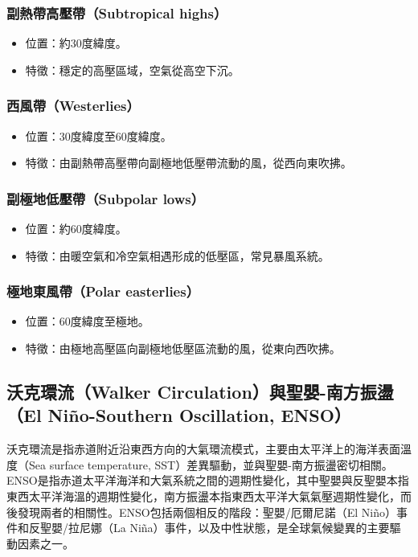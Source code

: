 \documentclass[a4paper,12pt]{report}
\begin{document}
\begin{itemize}
\subsubsection{副熱帶高壓帶（Subtropical highs）}
\begin{itemize}
  \item 位置：約30度緯度。
  \item 特徵：穩定的高壓區域，空氣從高空下沉。
\end{itemize}
\subsubsection{西風帶（Westerlies）}
\begin{itemize}
  \item 位置：30度緯度至60度緯度。
  \item 特徵：由副熱帶高壓帶向副極地低壓帶流動的風，從西向東吹拂。
\end{itemize}
\subsubsection{副極地低壓帶（Subpolar lows）}
\begin{itemize}
  \item 位置：約60度緯度。
  \item 特徵：由暖空氣和冷空氣相遇形成的低壓區，常見暴風系統。
\end{itemize}
\subsubsection{極地東風帶（Polar easterlies）}
\begin{itemize}
  \item 位置：60度緯度至極地。
  \item 特徵：由極地高壓區向副極地低壓區流動的風，從東向西吹拂。
\end{itemize}
\subsection{沃克環流（Walker Circulation）與聖嬰-南方振盪（El Niño-Southern Oscillation, ENSO）}
沃克環流是指赤道附近沿東西方向的大氣環流模式，主要由太平洋上的海洋表面溫度（Sea surface temperature, SST）差異驅動，並與聖嬰-南方振盪密切相關。ENSO是指赤道太平洋海洋和大氣系統之間的週期性變化，其中聖嬰與反聖嬰本指東西太平洋海溫的週期性變化，南方振盪本指東西太平洋大氣氣壓週期性變化，而後發現兩者的相關性。ENSO包括兩個相反的階段：聖嬰/厄爾尼諾（El Niño）事件和反聖嬰/拉尼娜（La Niña）事件，以及中性狀態，是全球氣候變異的主要驅動因素之一。
\bct\bfH\ctr{}\ef\FB\ect

\end{itemize}
\end{document}
